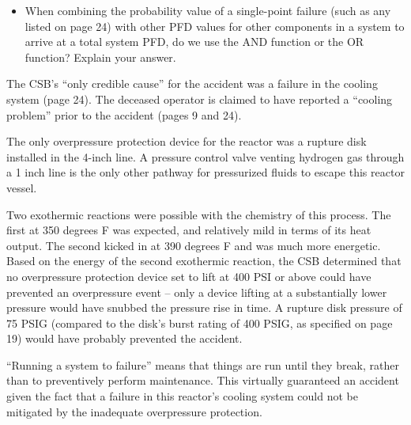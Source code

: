 \begin{itemize}
\item{} When combining the probability value of a single-point failure (such as any listed on page 24) with other PFD values for other components in a system to arrive at a total system PFD, do we use the AND function or the OR function?  Explain your answer.
\end{itemize}














The CSB's ``only credible cause'' for the accident was a failure in the cooling system (page 24).  The deceased operator is claimed to have reported a ``cooling problem'' prior to the accident (pages 9 and 24).

\vskip 10pt

The only overpressure protection device for the reactor was a rupture disk installed in the 4-inch line.  A pressure control valve venting hydrogen gas through a 1 inch line is the only other pathway for pressurized fluids to escape this reactor vessel.

\vskip 10pt

Two exothermic reactions were possible with the chemistry of this process.  The first at 350 degrees F was expected, and relatively mild in terms of its heat output.  The second kicked in at 390 degrees F and was much more energetic.  Based on the energy of the second exothermic reaction, the CSB determined that no overpressure protection device set to lift at 400 PSI or above could have prevented an overpressure event -- only a device lifting at a substantially lower pressure would have snubbed the pressure rise in time.  A rupture disk pressure of 75 PSIG (compared to the disk's burst rating of 400 PSIG, as specified on page 19) would have probably prevented the accident.

\vskip 10pt

``Running a system to failure'' means that things are run until they break, rather than to preventively perform maintenance.  This virtually guaranteed an accident given the fact that a failure in this reactor's cooling system could not be mitigated by the inadequate overpressure protection.

